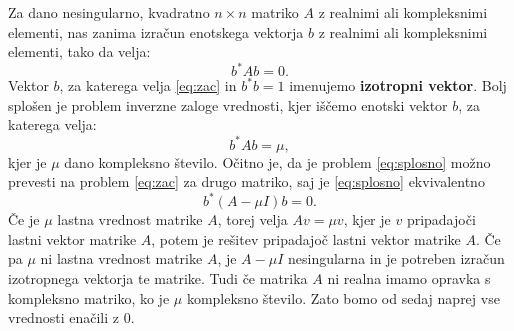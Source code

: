 \documentclass[12pt,a4paper]{amsart}
\theoremstyle{definition}
\theoremstyle{plain}
\begin{document}
Za dano nesingularno, kvadratno $n \times n$ matriko $A$ z realnimi ali kompleksnimi elementi, nas zanima izračun enotskega vektorja $b$ z realnimi ali kompleksnimi elementi, tako da velja:
\begin{equation}\label{eq:zac}
b^\ast Ab=0.
\end{equation}
Vektor $b$, za katerega velja \eqref{eq:zac} in $b^\ast b=1$  imenujemo \textbf{izotropni vektor}. 
Bolj splošen je problem inverzne zaloge vrednosti, kjer iščemo enotski vektor $b$, za katerega velja:
\begin{equation}\label{eq:splosno}
b^\ast Ab=\mu,
\end{equation}
kjer je $\mu$ dano kompleksno število. Očitno je, da je problem \eqref{eq:splosno} možno prevesti na problem \eqref{eq:zac} za drugo matriko, saj je \eqref{eq:splosno} ekvivalentno
$$b^\ast (A-\mu I)b=0.$$
Če je $\mu$ lastna vrednost matrike $A$, torej velja $Av=\mu v$, kjer je $v$ pripadajoči lastni vektor matrike $A$, potem je rešitev pripadajoč lastni vektor matrike $A$. Če pa $\mu$ ni lastna vrednost matrike $A$, je $A-\mu I$ nesingularna in je potreben izračun izotropnega vektorja te matrike. Tudi če matrika $A$ ni realna imamo opravka s kompleksno matriko, ko je $\mu$ kompleksno število. Zato bomo od sedaj naprej vse vrednosti enačili z $0$.
\end{document}
